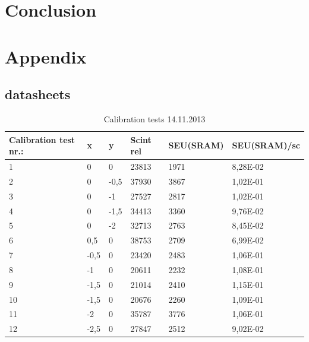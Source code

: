 \documentclass[12pt]{article}
\numberwithin{figure}{section}
\begin{document}
\newpage

\section{Conclusion}


\newpage
\FloatBarrier

\section{Appendix}
\label{appendix}

\subsection{datasheets}
\label{datasheets}
\begin{table}
  \centering
    \begin{tabular}{|l|l|l|l|l|l|} \hline
    Calibration test nr.: & x     & y     & Scint rel & SEU(\ac{SRAM}) & SEU(\ac{SRAM})/sc \\ \hline \hline
    1     & 0     & 0     & 23813 & 1971  & 8,28E-02 \\ \hline
    2     & 0     & -0,5  & 37930 & 3867  & 1,02E-01 \\ \hline
    3     & 0     & -1    & 27527 & 2817  & 1,02E-01 \\ \hline
    4     & 0     & -1,5  & 34413 & 3360  & 9,76E-02 \\ \hline
    5     & 0     & -2    & 32713 & 2763  & 8,45E-02 \\ \hline
    6     & 0,5   & 0     & 38753 & 2709  & 6,99E-02 \\ \hline
    7     & -0,5  & 0     & 23420 & 2483  & 1,06E-01 \\ \hline
    8     & -1    & 0     & 20611 & 2232  & 1,08E-01 \\ \hline	
    9     & -1,5  & 0     & 21014 & 2410  & 1,15E-01 \\ \hline
    10    & -1,5  & 0     & 20676 & 2260  & 1,09E-01 \\ \hline
    11    & -2    & 0     & 35787 & 3776  & 1,06E-01 \\ \hline
    12    & -2,5  & 0     & 27847 & 2512  & 9,02E-02 \\ \hline
    \end{tabular}%
      \caption{Calibration tests 14.11.2013}
      \label{test_14.11}
\end{table}%
\end{document}
